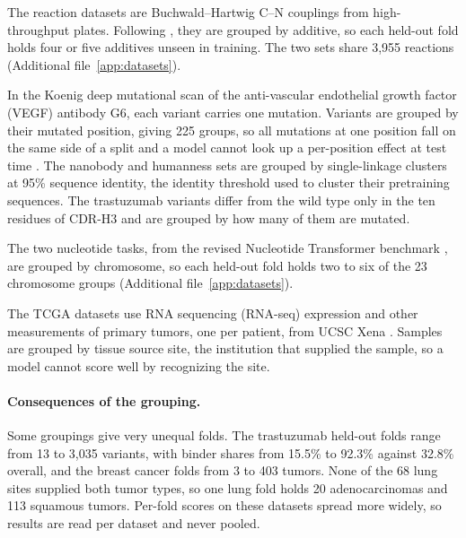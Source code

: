 The reaction datasets are Buchwald--Hartwig C--N couplings from high-throughput plates. Following \citet{Ahneman2018}, they are grouped by additive, so each held-out fold holds four or five additives unseen in training. The two sets share 3,955 reactions (Additional file~\ref{app:datasets}).

In the Koenig deep mutational scan of the anti-vascular endothelial growth factor (VEGF) antibody G6, each variant carries one mutation. %
Variants are grouped by their mutated position, giving 225 groups, so all mutations at one position fall on the same side of a split and a model cannot look up a per-position effect at test time \citep{Vieira2026}. The nanobody and humanness sets are grouped by single-linkage clusters at 95\% sequence identity, the identity threshold \citet{Kenlay2024} used to cluster their pretraining sequences. The trastuzumab variants differ from the wild type only in the ten residues of CDR-H3 and are grouped by how many of them are mutated.

The two nucleotide tasks, from the revised Nucleotide Transformer benchmark \citep{DallaTorre2025}, are grouped by chromosome, so each held-out fold holds two to six of the 23 chromosome groups (Additional file~\ref{app:datasets}).

The TCGA datasets use RNA sequencing (RNA-seq) expression and other measurements of primary tumors, one per patient, from UCSC Xena \citep{Goldman2020}. Samples are grouped by tissue source site, the institution that supplied the sample, so a model cannot score well by recognizing the site.

\paragraph{Consequences of the grouping.} Some groupings give very unequal folds. The trastuzumab held-out folds range from 13 to 3,035 variants, with binder shares from 15.5\% to 92.3\% against 32.8\% overall, and the breast cancer folds from 3 to 403 tumors. None of the 68 lung sites supplied both tumor types, so one lung fold holds 20 adenocarcinomas and 113 squamous tumors. Per-fold scores on these datasets spread more widely, so results are read per dataset and never pooled.
